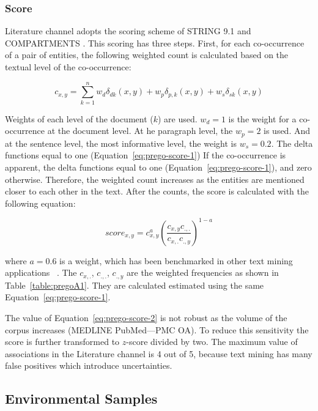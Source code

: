 \subsubsection{Score}

Literature channel adopts the scoring scheme of STRING 9.1 \parencite{franceschini2012string}
and COMPARTMENTS \parencite{binder2014compartments}. This scoring has three steps. 
First, for each co-occurrence of a pair of entities, the following weighted count is
calculated based on the textual level of the co-occurrence:

\begin{equation}
   c_{x,y} = \sum_{k=1}^{n}{w_d \delta_{dk}(x,y) +w_p \delta_{p,k}(x,y) + w_s \delta_{sk}(x,y)}
   \label{eq:prego-score-1}
\end{equation}

Weights of each level of the document ($k$) are used.
$w_d = 1$ is the weight for a co-occurrence at the document
level. 
At he paragraph level, the $w_p = 2$ is used. And at the sentence level, the most
informative level, the weight is $w_s = 0.2$.
The delta functions equal to one (Equation~\ref{eq:prego-score-1})
If the co-occurrence is apparent, the delta functions equal to one (Equation~\ref{eq:prego-score-1}),
and zero otherwise.
Therefore, the weighted count increases as the entities are mentioned 
closer to each other in the text. 
After the counts, the score is calculated with the following equation:

\begin{equation}
   score_{x,y} = c_{x,y}^a (\frac{c_{x,y} c_{.,.}}{c_{x, .}c_{.,y}})^{1-a}
   \label{eq:prego-score-2}
\end{equation}

where $a = 0.6$ is a weight, which has been benchmarked in other 
text mining applications ~\parencite{franceschini2012string, binder2014compartments, pletscher2015diseases}. 
The $c_{x,.}$, $c_{.,.}$, $c_{.,y}$ are the weighted frequencies as shown in Table~\ref{table:pregoA1}.
They are calculated estimated using the same Equation~\ref{eq:prego-score-1}. 

The value of Equation~\ref{eq:prego-score-2} is not robust as
the volume of the corpus increases (MEDLINE PubMed—PMC OA).
To reduce this sensitivity the score is further transformed to $z$-score divided by two.
The maximum value of associations in the Literature channel is 4 out of 5, because 
text mining has many false positives which introduce uncertainties.

   \subsection{Environmental Samples}
   \label{subsec:prego-envsamples}

